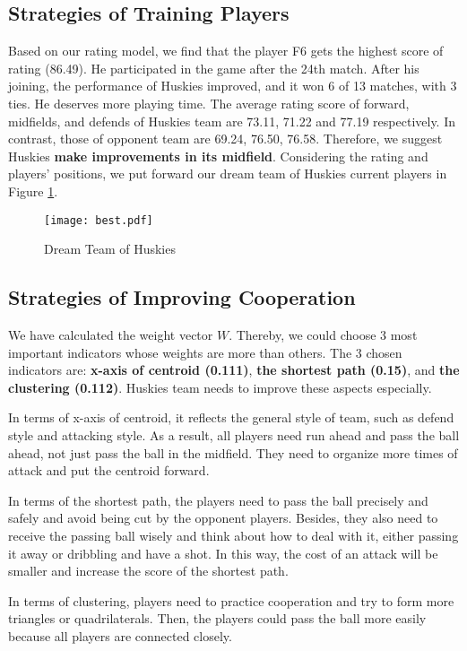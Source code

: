 \documentclass[12pt]{mcmthesis}
\begin{document}
\subsection{Strategies of Training Players}
Based on our rating model, we find that the player F6 gets the highest score of rating (86.49). He participated in the game after the 24th match. After his joining, the performance of Huskies improved, and it won 6 of 13 matches, with 3 ties. He deserves more playing time. The average rating score of forward, midfields, and defends of Huskies team are 73.11, 71.22 and 77.19 respectively. In contrast, those of opponent team are 69.24, 76.50, 76.58. Therefore, we suggest Huskies \textbf{make improvements in its midfield}. Considering the rating and players' positions, we put forward our dream team of Huskies current players in Figure \ref{fig:team}.
\begin{figure}[h]
	\centering
	\texttt{[image: best.pdf]}
	\caption{Dream Team of Huskies}
	\label{fig:team}
\end{figure}

\subsection{Strategies of Improving Cooperation}
We have calculated the weight vector $W$. Thereby, we could choose 3 most important indicators whose weights are more than others. The 3 chosen indicators are: \textbf{x-axis of centroid (0.111)}, \textbf{the shortest path (0.15)}, and \textbf{the clustering (0.112)}. Huskies team needs to improve these aspects especially.

In terms of x-axis of centroid, it reflects the general style of team, such as defend style and attacking style. As a result, all players need run ahead and pass the ball ahead, not just pass the ball in the midfield. They need to organize more times of attack and put the centroid forward.

In terms of the shortest path, the players need to pass the ball precisely and safely and avoid being cut by the opponent players. Besides, they also need to receive the passing ball wisely and think about how to deal with it, either passing it away or dribbling and have a shot. In this way, the cost of an attack will be smaller and increase the score of the shortest path.

In terms of clustering, players need to practice cooperation and try to form more triangles or quadrilaterals. Then, the players could pass the ball more easily because all players are connected closely.
\end{document}
